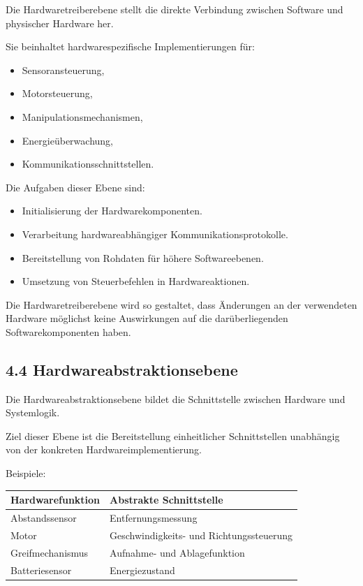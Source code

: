 \documentclass[
]{article}
\providecommand{\tightlist}{%
  \setlength{\itemsep}{0pt}\setlength{\parskip}{0pt}}
\begin{document}
Die Hardwaretreiberebene stellt die direkte Verbindung zwischen Software
und physischer Hardware her.

Sie beinhaltet hardwarespezifische Implementierungen für:

\begin{itemize}
\tightlist
\item
  Sensoransteuerung,
\item
  Motorsteuerung,
\item
  Manipulationsmechanismen,
\item
  Energieüberwachung,
\item
  Kommunikationsschnittstellen.
\end{itemize}

Die Aufgaben dieser Ebene sind:

\begin{itemize}
\tightlist
\item
  Initialisierung der Hardwarekomponenten.
\item
  Verarbeitung hardwareabhängiger Kommunikationsprotokolle.
\item
  Bereitstellung von Rohdaten für höhere Softwareebenen.
\item
  Umsetzung von Steuerbefehlen in Hardwareaktionen.
\end{itemize}

Die Hardwaretreiberebene wird so gestaltet, dass Änderungen an der
verwendeten Hardware möglichst keine Auswirkungen auf die
darüberliegenden Softwarekomponenten haben.

\subsection{4.4
Hardwareabstraktionsebene}\label{hardwareabstraktionsebene-1}

Die Hardwareabstraktionsebene bildet die Schnittstelle zwischen Hardware
und Systemlogik.

Ziel dieser Ebene ist die Bereitstellung einheitlicher Schnittstellen
unabhängig von der konkreten Hardwareimplementierung.

Beispiele:

\begin{longtable}[]{@{}ll@{}}
\toprule\noalign{}
Hardwarefunktion & Abstrakte Schnittstelle \\
\midrule\noalign{}
\endhead
\bottomrule\noalign{}
\endlastfoot
Abstandssensor & Entfernungsmessung \\
Motor & Geschwindigkeits- und Richtungssteuerung \\
Greifmechanismus & Aufnahme- und Ablagefunktion \\
Batteriesensor & Energiezustand \\
\end{longtable}
\end{document}
